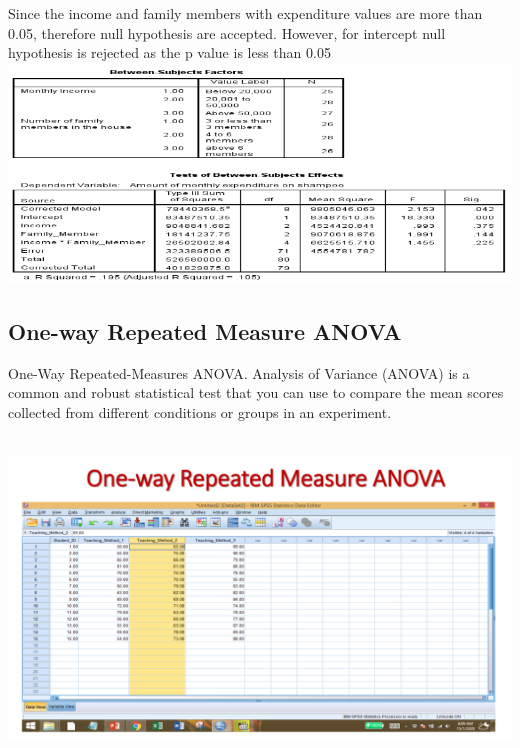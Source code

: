 \documentclass[
  letterpaper,
  DIV=11,
  numbers=noendperiod]{scrreprt}
\begin{document}
\begin{tcolorbox}[enhanced jigsaw, rightrule=.15mm, arc=.35mm, colframe=quarto-callout-note-color-frame, coltitle=black, left=2mm, colbacktitle=quarto-callout-note-color!10!white, bottomtitle=1mm, titlerule=0mm, colback=white, breakable, opacitybacktitle=0.6, opacityback=0, toprule=.15mm, toptitle=1mm, title=\textcolor{quarto-callout-note-color}{\faInfo}\hspace{0.5em}{Results Observation}, bottomrule=.15mm, leftrule=.75mm]

Since the income and family members with expenditure values are more
than 0.05, therefore null hypothesis are accepted. However, for
intercept null hypothesis is rejected as the p value is less than 0.05\\

\includegraphics{images/two-way-anova-out1.png}

\end{tcolorbox}

\subsection{One-way Repeated Measure
ANOVA}\label{one-way-repeated-measure-anova}

\hfill\break
One-Way Repeated-Measures ANOVA. Analysis of Variance (ANOVA) is a
common and robust statistical test that you can use to compare the mean
scores collected from different conditions or groups in an experiment.\\
\strut \\
\includegraphics{images/slides/img_Page_121.png}
\end{document}

